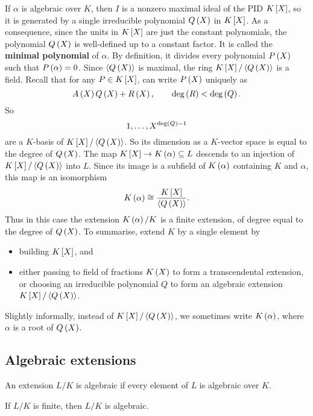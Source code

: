 If $ \alpha $ is algebraic over $ K $, then $ I $ is a nonzero maximal ideal of the PID $ K\sb{X} $, so it is generated by a single irreducible polynomial $ Q\rb{X} $ in $ K\sb{X} $. As a consequence, since the units in $ K\sb{X} $ are just the constant polynomials, the polynomial $ Q\rb{X} $ is well-defined up to a constant factor. It is called the \textbf{minimal polynomial} of $ \alpha $. By definition, it divides every polynomial $ P\rb{X} $ such that $ P\rb{\alpha} = 0 $. Since $ \ab{Q\rb{X}} $ is maximal, the ring $ K\sb{X} / \ab{Q\rb{X}} $ is a field. Recall that for any $ P \in K\sb{X} $, can write $ P\rb{X} $ uniquely as
$$ A\rb{X}Q\rb{X} + R\rb{X}, \qquad \deg\rb{R} < \deg\rb{Q}. $$
So
$$ 1, \dots, X^{\deg\rb{Q} - 1} $$
are a $ K $-basis of $ K\sb{X} / \ab{Q\rb{X}} $. So its dimension as a $ K $-vector space is equal to the degree of $ Q\rb{X} $. The map $ K\sb{X} \to K\rb{\alpha} \subseteq L $ descends to an injection of $ K\sb{X} / \ab{Q\rb{X}} $ into $ L $. Since its image is a subfield of $ K\rb{\alpha} $ containing $ K $ and $ \alpha $, this map is an isomorphism
$$ K\rb{\alpha} \cong \dfrac{K\sb{X}}{\ab{Q\rb{X}}}. $$
Thus in this case the extension $ K\rb{\alpha} / K $ is a finite extension, of degree equal to the degree of $ Q\rb{X} $. To summarise, extend $ K $ by a single element by
\begin{itemize}
\item building $ K\sb{X} $, and
\item either passing to field of fractions $ K\rb{X} $ to form a transcendental extension, or choosing an irreducible polynomial $ Q $ to form an algebraic extension $ K\sb{X} / \ab{Q\rb{X}} $.
\end{itemize}
Slightly informally, instead of $ K\sb{X} / \ab{Q\rb{X}} $, we sometimes write $ K\rb{\alpha} $, where $ \alpha $ is a root of $ Q\rb{X} $.

\subsection{Algebraic extensions}

\begin{definition}
An extension $ L / K $ is algebraic if every element of $ L $ is algebraic over $ K $.
\end{definition}

\begin{proposition}
If $ L / K $ is finite, then $ L / K $ is algebraic.
\end{proposition}

